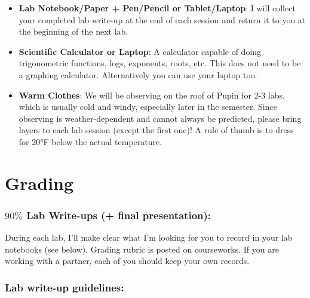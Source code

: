 \documentclass[12pt]{article}
\begin{document}
\begin{itemize}
\item \textbf{Lab Notebook/Paper + Pen/Pencil or Tablet/Laptop}: I will collect your completed lab write-up at the end of each session and return it to you at the beginning of the next lab.

\item \textbf{Scientific Calculator or Laptop}:  A calculator capable of doing trigonometric functions, logs, exponents, roots, etc. This does not need to be a graphing calculator. Alternatively you can use your laptop too.
 
\item \textbf{Warm Clothes}: We will be observing on the roof of Pupin for 2-3 labs, which is usually cold and windy, especially later in the semester. Since observing is weather-dependent and cannot always be predicted, please bring layers to each lab session (except the first one)! A rule of thumb is to dress for 20°F below the actual temperature. 
 
\end{itemize}
 
\section*{Grading}

\subsubsection*{$90\%$ Lab Write-ups (+ final presentation):}
\noindent During each lab, I'll make clear what I'm looking for you to record in your lab notebooks (see below). Grading rubric is posted on courseworks. If you are working with a partner, each of you should keep your own records. 
\subsubsection*{Lab write-up guidelines:}
 
\end{document}

